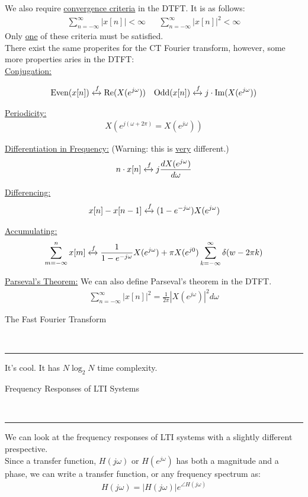 \documentclass{article}
\newcommand{\sheader}[1]{\underline{#1:}}
\newcommand{\ftrans}{\xleftrightarrow[]{f}}
\newcommand{\ejw}{{e^\jomega}}
\newcommand{\header}[1]{\begin{large}\noindent #1\end{large}\\\rule{\textwidth}{0.5pt}}
\newcommand{\gap}{\medskip\\}
\newcommand{\jomega}{{j\omega}}
\begin{document}
We also require \underline{convergence criteria} in the DTFT. It is as follows:
\begin{align*}
    \sum_{n=-\infty}^\infty | x[n] | < \infty && \sum_{n = -\infty}^\infty |x[n]|^2 < \infty
\end{align*}
Only \underline{one} of these criteria must be satisfied.
\gap
There exist the same properites for the CT Fourier transform, however, some more
properties aries in the DTFT:
\gap
\sheader{Conjugation} 

\begin{align*}
    \textrm{Even}(x[n]) \ftrans \textrm{Re}(X(\ejw)) && \textrm{Odd}(x[n]) \ftrans j\cdot \textrm{Im}(X(\ejw))
\end{align*}

\sheader{Periodicity}
\begin{align*}
    X(e^{j(\omega + 2\pi)} = X(\ejw))
\end{align*}

\sheader{Differentiation in Frequency} (Warning: this is \underline{very} different.)
\begin{align*}
    n \cdot x[n] \ftrans j \frac{d X(\ejw)}{d\omega}
\end{align*}

\sheader{Differencing}
\begin{align*}
    x[n] - x[n - 1] \ftrans (1 - e^{-\jomega} )X(\ejw)
\end{align*}

\sheader{Accumulating}
\begin{align*}
    \sum_{m = -\infty}^n x[m] \ftrans  \frac{1}{1 - e^{-\jomega}}X(\ejw) + \pi X(e^{j0})\sum_{k = -\infty}^\infty \delta(w - 2\pi k)
\end{align*}

\sheader{Parseval's Theorem} We can also define Parseval's theorem in the DTFT.
\begin{align*}
    \sum_{n = -\infty}^\infty |x[n]|^2 = \frac{1}{2\pi} |X(\ejw)|^2 d\omega
\end{align*}

\header{The Fast Fourier Transform}

It's cool. It has $N\log_2{N}$ time complexity.

\pagebreak

\header{Frequency Responses of LTI Systems}

We can look at the frequency responses of LTI systems with a slightly different prespective.
\gap
Since a transfer function, $H(\jomega)$ or $H(\ejw)$ has both a magnitude and a phase,
we can write a transfer function, or any frequency spectrum as:
\begin{align*}
    H(\jomega) = |H(\jomega)| e^{\angle H(\jomega)}
\end{align*}
\end{document}
